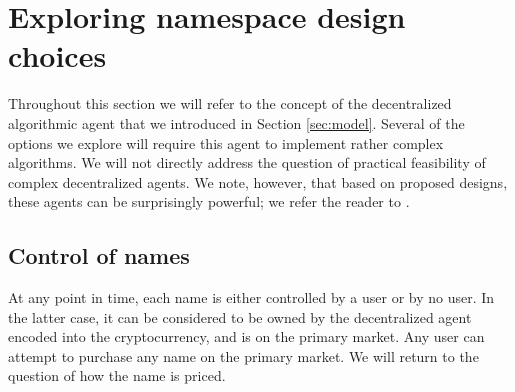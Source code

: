 \section{Exploring namespace design choices}
\label{sec:design}

Throughout this section we will refer to the concept of the decentralized algorithmic agent that we introduced in Section \ref{sec:model}. Several of the options we explore will require this agent to implement rather complex algorithms. We will not directly address the question of practical feasibility of complex decentralized agents. We note, however, that based on proposed designs, these agents can be surprisingly powerful; we refer the reader to \cite{bonneau2014decentralizing,ethereumwhitepaper,agents}.



\subsection{Control of names}
At any point in time, each name is either controlled by a user or by no user. In the latter case, it can be considered to be owned by the decentralized agent encoded into the cryptocurrency, and is on the primary market. Any user can attempt to purchase any name on the primary market. We will return to the question of how the name is priced. 

